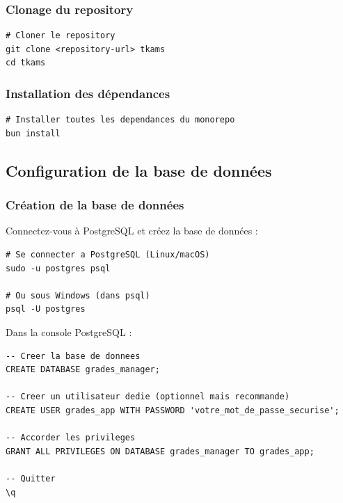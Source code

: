 \subsubsection{Clonage du repository}

\begin{lstlisting}[language={}, frame=single]
# Cloner le repository
git clone <repository-url> tkams
cd tkams
\end{lstlisting}

\subsubsection{Installation des dépendances}

\begin{lstlisting}[language={}, frame=single]
# Installer toutes les dependances du monorepo
bun install
\end{lstlisting}


\subsection{Configuration de la base de données}

\subsubsection{Création de la base de données}

Connectez-vous à PostgreSQL et créez la base de données :

\begin{lstlisting}[language={}, frame=single]
# Se connecter a PostgreSQL (Linux/macOS)
sudo -u postgres psql

# Ou sous Windows (dans psql)
psql -U postgres
\end{lstlisting}

Dans la console PostgreSQL :

\begin{lstlisting}[language={}, frame=single]
-- Creer la base de donnees
CREATE DATABASE grades_manager;

-- Creer un utilisateur dedie (optionnel mais recommande)
CREATE USER grades_app WITH PASSWORD 'votre_mot_de_passe_securise';

-- Accorder les privileges
GRANT ALL PRIVILEGES ON DATABASE grades_manager TO grades_app;

-- Quitter
\q
\end{lstlisting}

